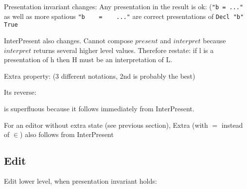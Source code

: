 
\bl
\* Presentation invariant changes: Any presentation in the result is ok: 
\* (\verb|"b = ..."| as well as more spatious \verb|"b    =    ..."| are correct presentations of \verb|Decl "b" True|
\el



\bl
\* {\sc InterPresent}  also changes. 
\* Cannot compose $present$ and $interpret$ because $interpret$ returns several higher level values.
\* Therefore restate: if l is a presentation of h then H must be an interpretation of L.
\el


 


Extra property: (3 different notations, 2nd is probably the best)


Its reverse:
 

is superfluous because it follows immediately from {\sc InterPresent}.

For an editor without extra state (see previous section), {\sc Extra} (with $=$ instead of $\in$) also follows from {\sc InterPresent}

\subsection{Edit}

\bl
\* Edit lower level, when presentation invariant holds:
\el


